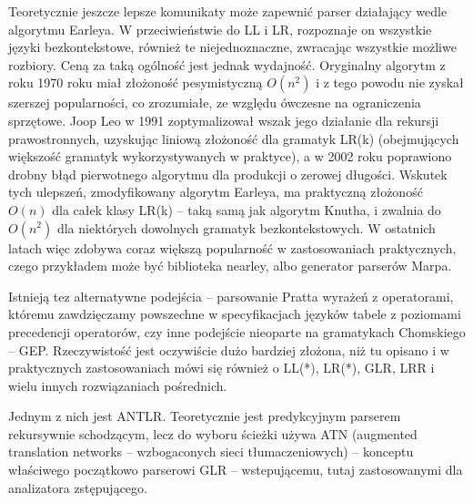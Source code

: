 Teoretycznie jeszcze lepsze komunikaty może zapewnić parser działający wedle algorytmu Earleya\cite{EARLEY_1970}. W przeciwieństwie do LL i LR, rozpoznaje on wszystkie języki bezkontekstowe, również te niejednoznaczne, zwracając wszystkie możliwe rozbiory. Ceną za taką ogólność jest jednak wydajność. Oryginalny algorytm z roku 1970 roku miał złożoność pesymistyczną $O(n^2)$ i z tego powodu nie zyskał szerszej popularności, co zrozumiałe, ze względu ówczesne na ograniczenia sprzętowe. Joop Leo w 1991 zoptymalizował wszak jego działanie dla rekursji prawostronnych, uzyskując liniową złożoność dla gramatyk LR(k)\cite{JOOP_LEO_1991} (obejmujących większość gramatyk wykorzystywanych w praktyce\cite{parsing_timeline_kegler}), a w 2002 roku poprawiono drobny błąd pierwotnego algorytmu dla produkcji o zerowej długości\cite{AYCOCK_HORSPOOL_NIGEL_2002}. Wskutek tych ulepszeń, zmodyfikowany algorytm Earleya, ma praktyczną złożoność $O(n)$ dla całek klasy LR(k) – taką samą jak algorytm Knutha, i zwalnia do $O(n^2)$ dla niektórych dowolnych gramatyk bezkontekstowych\cite{what_is_marpa_algorithm}. W ostatnich latach więc zdobywa coraz większą popularność w zastosowaniach praktycznych, czego przykładem może być biblioteka nearley\cite{nearley}, albo generator parserów Marpa\cite{marpa_paper, marpa_page}.

Istnieją tez alternatywne podejścia – parsowanie Pratta wyrażeń z operatorami, któremu zawdzięczamy powszechne w specyfikacjach języków tabele z poziomami precedencji operatorów, czy inne podejście nieoparte na gramatykach Chomskiego – GEP. Rzeczywistość jest oczywiście dużo bardziej złożona, niż tu opisano i w praktycznych zastosowaniach mówi się również o LL(*), LR(*), GLR, LRR i wielu innych rozwiązaniach pośrednich.

Jednym z nich jest ANTLR. Teoretycznie jest predykcyjnym parserem rekursywnie schodzącym, lecz do wyboru ścieżki używa ATN (augmented translation networks – wzbogaconych sieci tłumaczeniowych) – konceptu właściwego początkowo parserowi GLR – wstepującemu, tutaj zastosowanymi dla analizatora zstępującego\cite{PARR_2014}.

